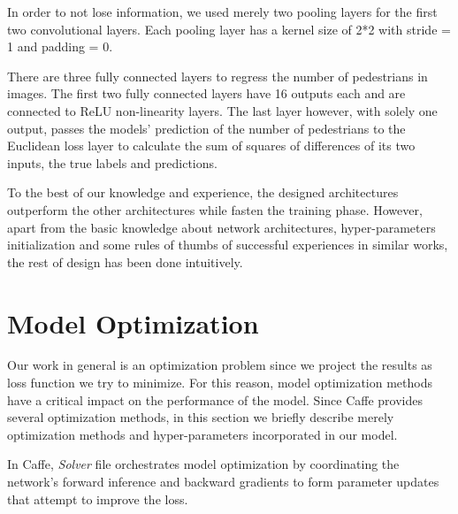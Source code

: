 \indent In order to not lose information, we used merely two pooling layers for the first two convolutional layers. Each pooling layer has a kernel size of 2*2 with stride = 1 and padding = 0. 

There are three fully connected layers to regress the number of pedestrians in images. The first two fully connected layers have 16 outputs each and are connected to ReLU non-linearity layers. The last layer however, with solely one output, passes the models' prediction of the number of pedestrians to the Euclidean loss layer to calculate the sum of squares of differences of its two inputs, the true labels and predictions.  

To the best of our knowledge and experience, the designed architectures outperform the other architectures while fasten the training phase. However, apart from the basic knowledge about network architectures, hyper-parameters initialization and some rules of thumbs of successful experiences in similar works, the rest of design has been done intuitively.


\section{Model Optimization}

Our work in general is an optimization problem since we project the results as loss function we try to minimize. For this reason, model optimization methods have a critical impact on the performance of the model. Since Caffe provides several optimization methods, in this section we briefly describe merely optimization methods and hyper-parameters incorporated in our model.  

\indent In Caffe, \textit{Solver} file  orchestrates model optimization by coordinating the network's forward inference and backward gradients to form parameter updates that attempt to improve the loss. 
